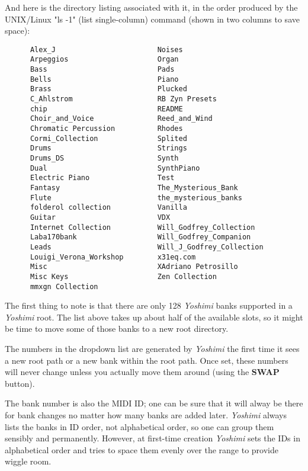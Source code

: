    And here is the directory listing associated with it, in the order
   produced by the UNIX/Linux "ls -1" (list single-column) command (shown in
   two columns to save space):

   \begin{verbatim}
      Alex_J                        Noises
      Arpeggios                     Organ
      Bass                          Pads
      Bells                         Piano
      Brass                         Plucked
      C_Ahlstrom                    RB Zyn Presets
      chip                          README
      Choir_and_Voice               Reed_and_Wind
      Chromatic Percussion          Rhodes
      Cormi_Collection              Splited
      Drums                         Strings
      Drums_DS                      Synth
      Dual                          SynthPiano
      Electric Piano                Test
      Fantasy                       The_Mysterious_Bank
      Flute                         the_mysterious_banks
      folderol collection           Vanilla
      Guitar                        VDX
      Internet Collection           Will_Godfrey_Collection
      Laba170bank                   Will_Godfrey_Companion
      Leads                         Will_J_Godfrey_Collection
      Louigi_Verona_Workshop        x31eq.com
      Misc                          XAdriano Petrosillo
      Misc Keys                     Zen Collection
      mmxgn Collection
   \end{verbatim}

   The first thing to note is that there are only 128 \textsl{Yoshimi} banks
   supported in a \textsl{Yoshimi} root.  The list above takes up about half
   of the available slots, so it might be time to move some of those banks
   to a new root directory.

   The numbers in the dropdown list are generated by \textsl{Yoshimi} the
   first time it sees a new root path or a new bank within the root path.
   Once set, these numbers will never change unless you actually move them
   around (using the \textbf{SWAP} button).

   The bank number is also the MIDI ID; one can be sure that it will alway
   be there for bank changes no matter how many banks are added later.
   \textsl{Yoshimi} always lists the banks in ID order, not alphabetical
   order, so one can group them sensibly and permanently. However, at
   first-time creation \textsl{Yoshimi}
   sets the IDs in alphabetical order and tries to space them evenly
   over the range to provide wiggle room.                                        

